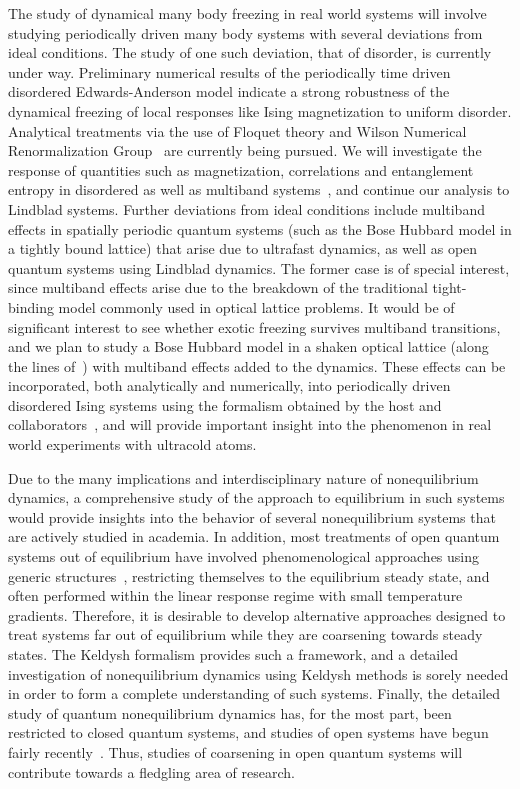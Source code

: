\documentclass[a4paper,9pt]{article}
\begin{document}
The study of dynamical many body freezing in real world systems will involve studying periodically driven many body systems with several deviations from ideal conditions. The study of one such deviation, that of disorder, is currently under way. Preliminary numerical results of the periodically time driven disordered Edwards-Anderson model indicate a strong robustness of the dynamical freezing of local responses like Ising magnetization to uniform disorder. Analytical treatments via the use of Floquet theory and Wilson Numerical Renormalization Group~\cite{mintert} are currently being pursued.
We will investigate the response of quantities such as magnetization, correlations and entanglement entropy in disordered as well as multiband systems~\cite{multiband}, and continue our analysis to Lindblad systems. Further deviations from ideal conditions include multiband effects in spatially periodic quantum systems (such as the Bose Hubbard model in a tightly bound lattice) that arise due to ultrafast dynamics, as well as open quantum systems using Lindblad dynamics. The former case is of special interest, since multiband effects arise due to the breakdown of the traditional tight-binding model commonly used in optical lattice problems. It would be of significant interest to see whether exotic freezing survives multiband transitions, and we plan to study a Bose Hubbard model in a shaken optical lattice (along the lines of~\cite{mintert}) with multiband effects added to the dynamics. These effects can be incorporated, both analytically and numerically, into periodically driven disordered Ising systems 
using the formalism obtained by the host and collaborators~\cite{multiband}, and will provide important insight into the phenomenon in real world experiments with ultracold atoms.

Due to the many implications and interdisciplinary nature of nonequilibrium dynamics, a comprehensive study of the approach to equilibrium in such systems would provide insights into the behavior of several nonequilibrium systems that are actively studied in academia. In addition, most treatments of open quantum systems out of equilibrium have involved phenomenological approaches using generic structures~\cite{openspin}, restricting  themselves to the equilibrium steady state, and often performed within the linear response regime with small temperature gradients. Therefore, it is desirable to develop alternative approaches designed to treat systems far out of equilibrium while they are coarsening towards steady states. The Keldysh formalism provides such a framework, and a detailed investigation of nonequilibrium dynamics using Keldysh 
methods is sorely needed in order to form a complete understanding of such systems. Finally, the detailed study of quantum nonequilibrium dynamics has, for the most part, been restricted to closed quantum systems, and studies of open systems have begun fairly recently~\cite{daley}. Thus, studies of coarsening in open quantum systems will contribute towards a fledgling area of research. 
\end{document}
